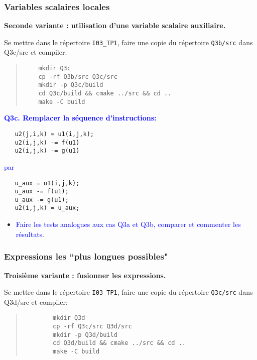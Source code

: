 \documentclass{beamer}
\begin{document}
\begin{frame}[fragile]
	\frametitle{Variables scalaires locales}
\vfill
{\bf Seconde variante : utilisation d'une variable scalaire auxiliaire.}
\vfill

Se mettre dans le r\'epertoire {\tt I03\_TP1}, faire une copie du r\'epertoire {\tt Q3b/src} dans {Q3c/src} et compiler:

\vfill
\begin{quote}
	\begin{verbatim}
	mkdir Q3c
	cp -rf Q3b/src Q3c/src
	mkdir -p Q3c/build
	cd Q3c/build && cmake ../src && cd ..
	make -C build
	\end{verbatim}
\end{quote}
\vfill
\end{frame}

\begin{frame}[fragile]
	
	\textcolor{blue}{\bf Q3c. Remplacer la s\'equence d'instructions:}
\begin{lstlisting}
   u2(j,i,k) = u1(i,j,k);
   u2(i,j,k) -= f(u1)
   u2(i,j,k) -= g(u1)
\end{lstlisting}

\textcolor{blue}{par} 
\begin{lstlisting}
   u_aux = u1(i,j,k);
   u_aux -= f(u1);
   u_aux -= g(u1);
   u2(i,j,k) = u_aux;
\end{lstlisting}
\begin{itemize}
	\item \textcolor{blue}{Faire les tests analogues aux cas Q3a et Q3b, comparer et commenter les r\'esultats.}
\end{itemize}
\end{frame}

\begin{frame}[fragile]
	\frametitle{Expressions les ``plus longues possibles"}
	\vfill
	{\bf Troisième variante : fusionner les expressions.}
	\vfill
	
	Se mettre dans le r\'epertoire {\tt I03\_TP1}, faire une copie du r\'epertoire {\tt Q3c/src} dans {Q3d/src} et compiler:
	
	\vfill
	\begin{quote}
		\begin{verbatim}
		mkdir Q3d
		cp -rf Q3c/src Q3d/src
		mkdir -p Q3d/build
		cd Q3d/build && cmake ../src && cd ..
		make -C build
		\end{verbatim}
	\end{quote}
	\vfill
\end{frame}
\end{document}
